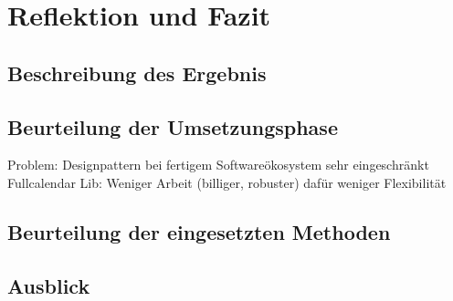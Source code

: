 \section{Reflektion und Fazit}
\subsection{Beschreibung des Ergebnis}
\subsection{Beurteilung der Umsetzungsphase}
Problem: Designpattern bei fertigem Softwareökosystem sehr eingeschränkt
Fullcalendar Lib: Weniger Arbeit (billiger, robuster) dafür weniger
Flexibilität

\subsection{Beurteilung der eingesetzten Methoden}

\subsection{Ausblick}